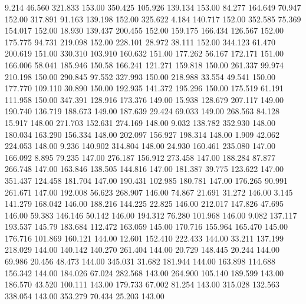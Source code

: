    9.214   46.560  321.833       153.00
 350.425  105.926  139.134       153.00
  84.277  164.649   70.947       152.00
 317.891   91.163  139.198       152.00
 325.622    4.184  140.717       152.00
 352.585   75.369  154.017       152.00
  18.930  139.437  200.455       152.00
 159.175  166.434  126.567       152.00
 175.775   94.731  219.098       152.00
 228.101   28.972   38.111       152.00
 344.123   61.470  200.619       151.00
 330.310  103.910  160.632       151.00
 177.262   56.167  172.171       151.00
 166.006   58.041  185.946       150.58
 166.241  121.271  159.818       150.00
 261.337   99.974  210.198       150.00
 290.845   97.552  327.993       150.00
 218.988   33.554   49.541       150.00
 177.770  109.110   30.890       150.00
 192.935  141.372  195.296       150.00
 175.519   61.191  111.958       150.00
 347.391  128.916  173.376       149.00
  15.938  128.679  207.117       149.00
 190.740  136.719  188.673       149.00
 187.639   29.424   69.033       149.00
 268.563   84.128   15.917       148.00
 271.703  152.631  274.169       148.00
   9.032  138.782  352.930       148.00
 180.034  163.290  156.334       148.00
 202.097  156.927  198.314       148.00
   1.909   42.062  224.053       148.00
   9.236  140.902  314.804       148.00
  24.930  160.461  235.080       147.00
 166.092    8.895   79.235       147.00
 276.187  156.912  273.458       147.00
 188.284   87.877  266.748       147.00
 163.846  138.505  144.816       147.00
 181.387   39.775  123.622       147.00
 351.437  124.458  181.704       147.00
 190.431  102.985  180.781       147.00
 176.265   90.991  261.671       147.00
 192.008   56.623  268.907       146.00
  74.867   21.691   31.272       146.00
   3.145  141.279  168.042       146.00
 188.216  144.225   22.825       146.00
 212.017  147.826   47.695       146.00
  59.383  146.146   50.142       146.00
 194.312   76.280  101.968       146.00
   9.082  137.117  193.537       145.79
 183.684  112.472  163.059       145.00
 170.716  155.964  165.470       145.00
 176.716  101.869  160.121       144.00
  12.601  152.410  222.433       144.00
  33.211  137.199  218.029       144.00
 140.142  140.270  261.404       144.00
  20.729  148.445   20.244       144.00
  69.986   20.456   48.473       144.00
 345.031   31.682  181.944       144.00
 163.898  114.688  156.342       144.00
 184.026   67.024  282.568       143.00
 264.900  105.140  189.599       143.00
 186.570   43.520  100.111       143.00
 179.733   67.002   81.254       143.00
 315.028  132.563  338.054       143.00
 353.279   70.434   25.203       143.00
